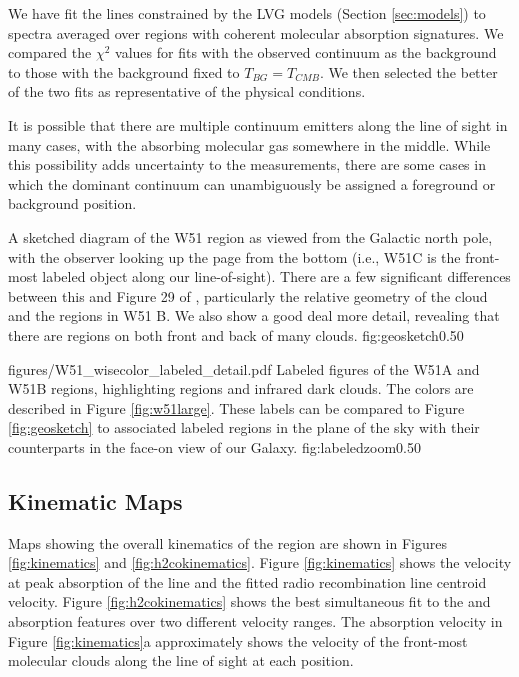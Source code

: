 We have fit the \formaldehyde lines constrained by the LVG models (Section
\ref{sec:models}) to spectra averaged over regions with coherent molecular
absorption signatures.  We compared the $\chi^2$ values for fits with the
observed continuum as the background to those with the background fixed to
$T_{BG} = T_{CMB}$.  We then selected the better of the two fits as
representative of the physical conditions.

It is possible that there are multiple continuum emitters along the line of
sight in many cases, with the absorbing molecular gas somewhere in the middle.
While this possibility adds uncertainty to the measurements, there are some
cases in which the dominant continuum can unambiguously be assigned a
foreground or background position.

{A sketched diagram of the W51 region as viewed from the Galactic north pole,
with the observer looking up the page from the bottom (i.e., W51C is the 
front-most labeled object along our line-of-sight).
There are a few significant differences between this and Figure 29 of \citet{Kang2010a},
particularly the relative geometry of the cloud and the \hii regions in W51 B.
We also show a good deal more detail, revealing that there are \hii regions on both front
and back of many clouds.
}
{fig:geosketch}{0.5}{0}

\Figure
{figures/W51_wisecolor_labeled_detail.pdf}
{Labeled figures of the W51A and W51B regions, highlighting \hii regions and
infrared dark clouds.   The colors are described in Figure \ref{fig:w51large}.
These labels can be compared to Figure \ref{fig:geosketch} to associated
labeled regions in the plane of the sky with their counterparts in the face-on
view of our Galaxy.}
{fig:labeledzoom}{0.5}{0}


\subsection{Kinematic Maps}
Maps showing the overall kinematics of the region are shown in Figures
\ref{fig:kinematics} and \ref{fig:h2cokinematics}.  Figure \ref{fig:kinematics}
shows the velocity at peak absorption of the \formaldehyde \oneone line and the
fitted radio recombination line centroid velocity.  Figure
\ref{fig:h2cokinematics} shows the best simultaneous fit to the \formaldehyde
\oneone and \twotwo absorption features over two different velocity ranges.
The \oneone absorption velocity in Figure \ref{fig:kinematics}a approximately
shows the velocity of the front-most molecular clouds along the line of sight
at each position.

